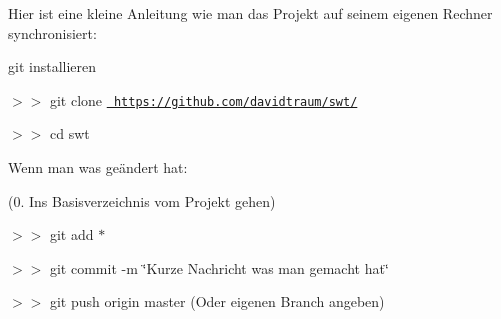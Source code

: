 Hier ist eine kleine Anleitung wie man das Projekt auf seinem eigenen Rechner synchronisiert\+:


\begin{DoxyEnumerate}
\item git installieren
\item $>$$>$ git clone \href{https://github.com/davidtraum/swt/}{\texttt{ https\+://github.\+com/davidtraum/swt/}}
\item $>$$>$ cd swt
\end{DoxyEnumerate}

Wenn man was geändert hat\+:

(0. Ins Basisverzeichnis vom Projekt gehen)
\begin{DoxyEnumerate}
\item $>$$>$ git add $\ast$
\end{DoxyEnumerate}
\begin{DoxyEnumerate}
\item $>$$>$ git commit -\/m \char`\"{}\+Kurze Nachricht was man gemacht hat\char`\"{}
\item $>$$>$ git push origin master (Oder eigenen Branch angeben) 
\end{DoxyEnumerate}